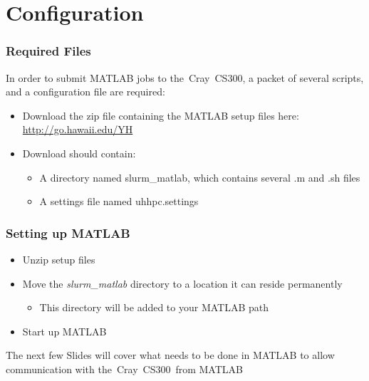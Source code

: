 \documentclass[t]{beamer}
\newcommand{\CNAME}{the~Cray~CS300}
\begin{document}
\section{Configuration}

\begin{frame}
  \frametitle{Required Files}
  In order to submit MATLAB jobs to \CNAME, a packet of several scripts, and a configuration file are required:
  \begin{itemize}
  \item Download the zip file containing the MATLAB setup files here: \url{http://go.hawaii.edu/YH}
  \item Download should contain:
    \begin{itemize}
    \item A directory named slurm\_matlab, which contains several .m and .sh files
    \item A settings file named uhhpc.settings
    \end{itemize}
  \end{itemize}
\end{frame}


\begin{frame}
  \frametitle{Setting up MATLAB}
  \begin{itemize}
  \item Unzip setup files
  \item Move the \emph{slurm\_matlab} directory to a location it can reside permanently
    \begin{itemize}
    \item This directory will be added to your MATLAB path
    \end{itemize}
  \item Start up MATLAB
  \end{itemize}
  The next few Slides will cover what needs to be done in MATLAB to allow communication with \CNAME~from MATLAB
\end{frame}
\end{document}
